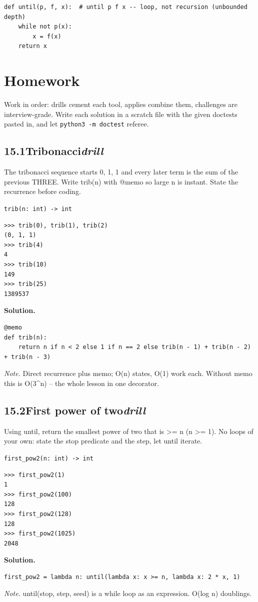 \documentclass[10pt,letterpaper]{book}
\begin{document}
\begin{lstlisting}[style=ex]
def until(p, f, x):  # until p f x -- loop, not recursion (unbounded depth)
    while not p(x):
        x = f(x)
    return x
\end{lstlisting}
\section{Homework}
Work in order: drills cement each tool, applies combine them,
challenges are interview-grade. Write each solution in a scratch file with
the given doctests pasted in, and let \texttt{python3 -m doctest} referee.
\subsection*{15.1\quad Tribonacci\hfill\textnormal{\textit{drill}}}
The tribonacci sequence starts 0, 1, 1 and every later term is the sum of the previous THREE. Write trib(n) with @memo so large n is instant. State the recurrence before coding.

\noindent\texttt{trib(n: int) -> int}
\begin{lstlisting}[style=ex]
>>> trib(0), trib(1), trib(2)
(0, 1, 1)
>>> trib(4)
4
>>> trib(10)
149
>>> trib(25)
1389537
\end{lstlisting}
\noindent\textbf{Solution.}
\begin{lstlisting}[style=code]
@memo
def trib(n):
    return n if n < 2 else 1 if n == 2 else trib(n - 1) + trib(n - 2) + trib(n - 3)
\end{lstlisting}
\noindent\textit{Note.} Direct recurrence plus memo; O(n) states, O(1) work each. Without memo this is O(3\^{}n) -- the whole lesson in one decorator.

\subsection*{15.2\quad First power of two\hfill\textnormal{\textit{drill}}}
Using until, return the smallest power of two that is >= n (n >= 1). No loops of your own: state the stop predicate and the step, let until iterate.

\noindent\texttt{first\_pow2(n: int) -> int}
\begin{lstlisting}[style=ex]
>>> first_pow2(1)
1
>>> first_pow2(100)
128
>>> first_pow2(128)
128
>>> first_pow2(1025)
2048
\end{lstlisting}
\noindent\textbf{Solution.}
\begin{lstlisting}[style=code]
first_pow2 = lambda n: until(lambda x: x >= n, lambda x: 2 * x, 1)
\end{lstlisting}
\noindent\textit{Note.} until(stop, step, seed) is a while loop as an expression. O(log n) doublings.
\end{document}
